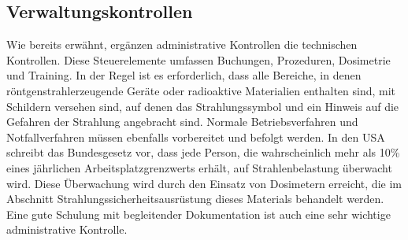 \subsection{Verwaltungskontrollen}
Wie bereits erwähnt, ergänzen administrative Kontrollen die technischen Kontrollen. Diese Steuerelemente umfassen Buchungen, Prozeduren, Dosimetrie und Training. In der Regel ist es erforderlich, dass alle Bereiche, in denen röntgenstrahlerzeugende Geräte oder radioaktive Materialien enthalten sind, mit Schildern versehen sind, auf denen das Strahlungssymbol und ein Hinweis auf die Gefahren der Strahlung angebracht sind. Normale Betriebsverfahren und Notfallverfahren müssen ebenfalls vorbereitet und befolgt werden. In den USA schreibt das Bundesgesetz vor, dass jede Person, die wahrscheinlich mehr als 10\% eines jährlichen Arbeitsplatzgrenzwerts erhält, auf Strahlenbelastung überwacht wird. Diese Überwachung wird durch den Einsatz von Dosimetern erreicht, die im Abschnitt Strahlungssicherheitsausrüstung dieses Materials behandelt werden. Eine gute Schulung mit begleitender Dokumentation ist auch eine sehr wichtige administrative Kontrolle.

